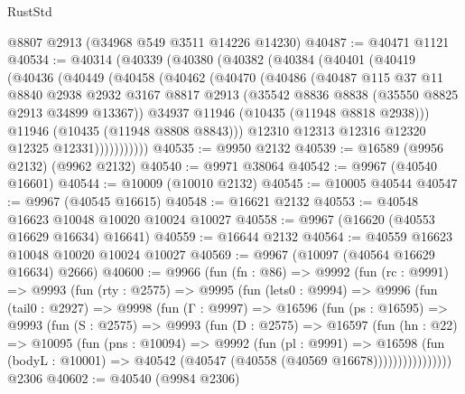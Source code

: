 \begin{lexlean}{RustStd}
\begin{coremodule}
    @8807
    @2913
    (@34968 @549 @3511 @14226 @14230)
@40487 := @40471 @1121
@40534 := @40314
    (@40339
      (@40380
        (@40382
          (@40384
            (@40401
              (@40419
                (@40436
                  (@40449
                    (@40458
                      (@40462
                        (@40470
                          (@40486
                            (@40487
                              @115
                              @37
                              @11
                              @8840
                              @2938
                              @2932
                              @3167
                              @8817
                              @2913
                              (@35542 @8836 @8838 (@35550 @8825 @2913 @34899 @13367))
                              @34937
                              @11946
                              (@10435 (@11948 @8818 @2938)))
                            @11946
                            (@10435 (@11948 @8808 @8843)))
                          @12310
                          @12313
                          @12316
                          @12320
                          @12325
                          @12331)))))))))))
@40535 := @9950 @2132
@40539 := @16589 (@9956 @2132) (@9962 @2132)
@40540 := @9971 @38064
@40542 := @9967 (@40540 @16601)
@40544 := @10009 (@10010 @2132)
@40545 := @10005 @40544
@40547 := @9967 (@40545 @16615)
@40548 := @16621 @2132
@40553 := @40548 @16623 @10048 @10020 @10024 @10027
@40558 := @9967 (@16620 (@40553 @16629 @16634) @16641)
@40559 := @16644 @2132
@40564 := @40559 @16623 @10048 @10020 @10024 @10027
@40569 := @9967 (@10097 (@40564 @16629 @16634) @2666)
@40600 := @9966
    (fun (fn : @86) =>
    @9992
      (fun (rc : @9991) =>
      @9993
        (fun (rty : @2575) =>
        @9995
          (fun (lets0 : @9994) =>
          @9996
            (fun (tail0 : @2927) =>
            @9998
              (fun (Γ : @9997) =>
              @16596
                (fun (ps : @16595) =>
                @9993
                  (fun (S : @2575) =>
                  @9993
                    (fun (D : @2575) =>
                    @16597
                      (fun (hn : @22) =>
                      @10095
                        (fun (pns : @10094) =>
                        @9992
                          (fun (pl : @9991) =>
                          @16598
                            (fun (bodyL : @10001) =>
                            @40542 (@40547 (@40558 (@40569 @16678))))))))))))))))
    @2306
@40602 := @40540 (@9984 @2306)

\end{coremodule}
\end{lexlean}
